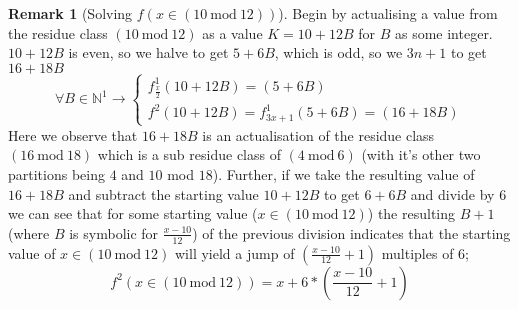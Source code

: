 \documentclass[12pt,a4paper]{amsart}
\numberwithin{equation}{section}
\theoremstyle{plain}
\theoremstyle{definition}
\newtheorem{Rem}[Th]{Remark}
\begin{document}
\begin{Rem}[Solving $f \left ( x \in \left ( 10\:\mathrm{mod}\:12 \right ) \right )$]
Begin by actualising a value from the residue class $\left ( 10\:\mathrm{mod}\:12 \right )$ as a value $K = 10 + 12B$ for $B$ as some integer. $10 + 12B$ is even, so we halve to get $5 + 6B$, which is odd, so we $3n+1$ to get $16+18B$
\begin{equation}
\forall B \in \mathbb{N}^{1} \rightarrow \left \{  \begin{matrix}
f^{1}_{\frac{x}{2}} \left ( 10+12B \right ) = \left ( 5+6B \right ) \\ 
f^{2} \left ( 10+12B \right ) = f^{1}_{3x+1} \left ( 5+6B \right ) =  \left ( 16+18B \right )
\end{matrix} \right.
\end{equation}
Here we observe that $16+18B$ is an actualisation of the residue class  $\left ( 16\:\mathrm{mod}\:18 \right )$ which is a sub residue class of  $\left ( 4\:\mathrm{mod}\:6 \right )$ (with it's other two partitions being $4$ and $10$ mod $18$). Further, if we take the resulting value of $16+18B$ and subtract the starting value $10+12B$ to get $6+6B$ and divide by $6$ we can see that for some starting value ($x \in \left ( 10\:\mathrm{mod}\:12 \right )$) the resulting $B+1$ (where $B$ is symbolic for $\frac{x-10}{12}$) of the previous division indicates that the starting value of $x \in \left ( 10\:\mathrm{mod}\:12 \right )$ will yield a jump of $\left ( \frac{x-10}{12} + 1 \right )$ multiples of $6$;
\begin{equation}
f^{2} \left ( x \in \left ( 10\:\mathrm{mod}\:12 \right ) \right ) = x+6*\left ( \frac{x-10}{12} + 1 \right )
\end{equation}
\end{Rem}
\end{document}
